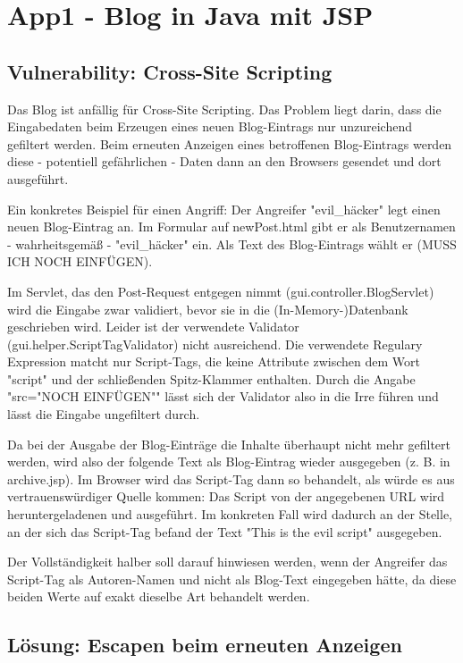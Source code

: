 \section{App1 - Blog in Java mit JSP}

\subsection{Vulnerability: Cross-Site Scripting}

Das Blog ist anfällig für Cross-Site Scripting. Das Problem liegt darin, dass die Eingabedaten beim Erzeugen eines neuen Blog-Eintrags nur unzureichend gefiltert werden. Beim erneuten Anzeigen eines betroffenen Blog-Eintrags werden diese - potentiell gefährlichen - Daten dann an den Browsers gesendet und dort ausgeführt. 

Ein konkretes Beispiel für einen Angriff: Der Angreifer "evil\_häcker" legt einen neuen Blog-Eintrag an. Im Formular auf newPost.html gibt er als Benutzernamen - wahrheitsgemäß - "evil\_häcker" ein. Als Text des Blog-Eintrags wählt er (MUSS ICH NOCH EINFÜGEN).

Im Servlet, das den Post-Request entgegen nimmt (gui.controller.BlogServlet) wird die Eingabe zwar validiert, bevor sie in die (In-Memory-)Datenbank geschrieben wird. Leider ist der verwendete Validator (gui.helper.ScriptTagValidator) nicht ausreichend. Die verwendete Regulary Expression matcht nur Script-Tags, die keine Attribute zwischen dem Wort "script" und der schließenden Spitz-Klammer enthalten. Durch die Angabe "src="NOCH EINFÜGEN"" lässt sich der Validator also in die Irre führen und lässt die Eingabe ungefiltert durch.

Da bei der Ausgabe der Blog-Einträge die Inhalte überhaupt nicht mehr gefiltert werden, wird also der folgende Text als Blog-Eintrag wieder ausgegeben (z. B. in archive.jsp). Im Browser wird das Script-Tag dann so behandelt, als würde es aus vertrauenswürdiger Quelle kommen: Das Script von der angegebenen URL wird heruntergeladenen und ausgeführt. Im konkreten Fall wird dadurch an der Stelle, an der sich das Script-Tag befand der Text "This is the evil script" ausgegeben.

Der Vollständigkeit halber soll darauf hinwiesen werden, wenn der Angreifer das Script-Tag als Autoren-Namen und nicht als Blog-Text eingegeben hätte, da diese beiden Werte auf exakt dieselbe Art behandelt werden.

\subsection{Lösung: Escapen beim erneuten Anzeigen}

